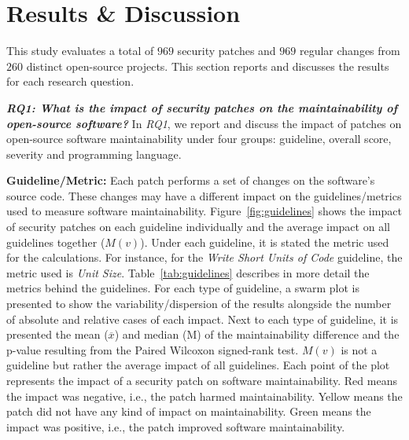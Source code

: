 \documentclass[smallextended]{svjour3}       %
\begin{document}
\section{Results \& Discussion}\label{sec:results}

This study evaluates a total of $969$ security patches and 
$969$ regular changes 
from $260$ distinct open-source projects. 
This section 
reports and discusses the results for each research question.
%

\textit{\textbf{RQ1: What is the impact of security patches on the
maintainability of open-source software?}} In \emph{RQ1}, we 
report and discuss the impact of patches on open-source software 
maintainability under four groups: guideline, overall score, 
severity and programming language.

\textbf{Guideline/Metric:} Each patch performs a set of changes
on the software's source code. These changes may have a 
different impact on the guidelines/metrics used to measure software 
maintainability. Figure~\ref{fig:guidelines} shows the impact of 
security patches on each guideline individually and the average 
impact on all guidelines together ($M(v)$). Under each guideline, it 
is stated the metric used for the calculations. For instance, for the 
\emph{Write Short Units of Code} guideline, the metric used is 
\emph{Unit Size}. Table~\ref{tab:guidelines} describes in more 
detail the metrics behind the guidelines. For each type of 
guideline, a swarm plot is presented to show the variability/dispersion 
of the results alongside the number of absolute and 
relative cases of each impact. Next to each type of guideline, it is 
presented the mean ($\overline{x}$) and median (M) of the 
maintainability difference and the p-value resulting from the Paired 
Wilcoxon signed-rank test. $M(v)$ is not a guideline but rather the 
average impact of all guidelines. Each point of the plot represents 
the impact of a security patch on software maintainability. Red 
means the impact was negative, i.e., the patch harmed 
maintainability. Yellow means the patch did not have any kind of 
impact on maintainability. Green means the impact was positive, i.e., 
the patch improved software maintainability.
\end{document}
